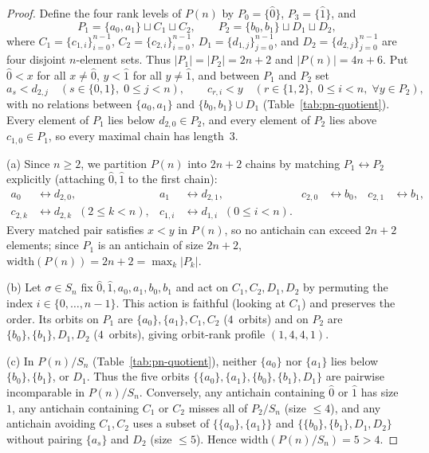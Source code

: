 \documentclass[11pt,a4paper]{article}
\theoremstyle{definition}
\newcommand{\Sn}{S_n}
\newcommand{\width}{\mathrm{width}}
\begin{document}
\begin{proof}
Define the four rank levels of $P(n)$ by $P_0 = \{\hat{0}\}$, $P_3 = \{\hat{1}\}$, and
\[
  P_1 = \{a_0, a_1\} \sqcup C_1 \sqcup C_2, \qquad
  P_2 = \{b_0, b_1\} \sqcup D_1 \sqcup D_2,
\]
where $C_1 = \{c_{1,i}\}_{i=0}^{n-1}$, $C_2 = \{c_{2,i}\}_{i=0}^{n-1}$, $D_1 = \{d_{1,j}\}_{j=0}^{n-1}$, and $D_2 = \{d_{2,j}\}_{j=0}^{n-1}$ are four disjoint $n$-element sets. Thus $|P_1| = |P_2| = 2n+2$ and $|P(n)| = 4n+6$. Put $\hat{0} < x$ for all $x \neq \hat{0}$, $y < \hat{1}$ for all $y \neq \hat{1}$, and between $P_1$ and $P_2$ set
\[
  a_s < d_{2,j} \quad (s \in \{0,1\},\; 0 \le j < n), \qquad
  c_{r,i} < y \quad (r \in \{1,2\},\; 0 \le i < n,\; \forall y \in P_2),
\]
with no relations between $\{a_0, a_1\}$ and $\{b_0, b_1\} \cup D_1$ (Table~\ref{tab:pn-quotient}). Every element of $P_1$ lies below $d_{2,0} \in P_2$, and every element of $P_2$ lies above $c_{1,0} \in P_1$, so every maximal chain has length~$3$.

(a) Since $n \ge 2$, we partition $P(n)$ into $2n+2$ chains by matching $P_1 \leftrightarrow P_2$ explicitly (attaching $\hat{0}, \hat{1}$ to the first chain):
\begin{align*}
  a_0 &\leftrightarrow d_{2,0}, & a_1 &\leftrightarrow d_{2,1}, &
  c_{2,0} &\leftrightarrow b_0, & c_{2,1} &\leftrightarrow b_1, \\
  c_{2,k} &\leftrightarrow d_{2,k} \;\; (2 \le k < n), &
  c_{1,i} &\leftrightarrow d_{1,i} \;\; (0 \le i < n). & &
\end{align*}
Every matched pair satisfies $x < y$ in $P(n)$, so no antichain can exceed $2n+2$ elements; since $P_1$ is an antichain of size $2n+2$, $\width(P(n)) = 2n+2 = \max_k |P_k|$.

(b) Let $\sigma \in \Sn$ fix $\hat{0}, \hat{1}, a_0, a_1, b_0, b_1$ and act on $C_1, C_2, D_1, D_2$ by permuting the index $i \in \{0,\dots,n-1\}$. This action is faithful (looking at $C_1$) and preserves the order. Its orbits on $P_1$ are $\{a_0\}, \{a_1\}, C_1, C_2$ ($4$~orbits) and on $P_2$ are $\{b_0\}, \{b_1\}, D_1, D_2$ ($4$~orbits), giving orbit-rank profile $(1,4,4,1)$.

(c) In $P(n)/\Sn$ (Table~\ref{tab:pn-quotient}), neither $\{a_0\}$ nor $\{a_1\}$ lies below $\{b_0\}, \{b_1\}$, or $D_1$. Thus the five orbits $\{\{a_0\}, \{a_1\}, \{b_0\}, \{b_1\}, D_1\}$ are pairwise incomparable in $P(n)/\Sn$. Conversely, any antichain containing $\hat{0}$ or $\hat{1}$ has size~$1$, any antichain containing $C_1$ or $C_2$ misses all of $P_2/\Sn$ (size $\le 4$), and any antichain avoiding $C_1, C_2$ uses a subset of $\{\{a_0\},\{a_1\}\}$ and $\{\{b_0\},\{b_1\},D_1,D_2\}$ without pairing $\{a_s\}$ and $D_2$ (size $\le 5$). Hence $\width(P(n)/\Sn) = 5 > 4$.
\end{proof}
\end{document}
